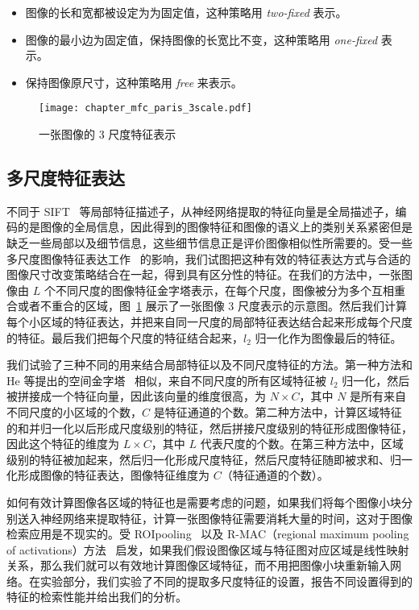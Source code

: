 \begin{itemize}
\item 图像的长和宽都被设定为为固定值，这种策略用 \emph{two-fixed} 表示。

\item 图像的最小边为固定值，保持图像的长宽比不变，这种策略用 \emph{one-fixed} 表示。

\item 保持图像原尺寸，这种策略用 \emph{free} 来表示。
\end{itemize}

\begin{figure}[!t]
	\centering
	\texttt{[image: chapter\_mfc\_paris\_3scale.pdf]}
	\caption{一张图像的 3 尺度特征表示}
	\label{fig:img_multiscale_feature}
\end{figure}

\subsection{多尺度特征表达}\label{subsec:multiscale_img_repr}
不同于 SIFT~\cite{Lowe2004DistinctiveIF} 等局部特征描述子，从神经网络提取的特征向量是全局描述子，编码的是图像的全局信息，因此得到的图像特征和图像的语义上的类别关系紧密但是缺乏一些局部以及细节信息，这些细节信息正是评价图像相似性所需要的。受一些多尺度图像特征表达工作~\cite{Lazebnik2006BeyondBO,He2014SpatialPP} 的影响，我们试图把这种有效的特征表达方式与合适的图像尺寸改变策略结合在一起，得到具有区分性的特征。在我们的方法中，一张图像由 $L$ 个不同尺度的图像特征金字塔表示，在每个尺度，图像被分为多个互相重合或者不重合的区域，图~\ref{fig:img_multiscale_feature} 展示了一张图像 3 尺度表示的示意图。然后我们计算每个小区域的特征表达，并把来自同一尺度的局部特征表达结合起来形成每个尺度的特征。最后我们把每个尺度的特征结合起来，$l_2$ 归一化作为图像最后的特征。

我们试验了三种不同的用来结合局部特征以及不同尺度特征的方法。第一种方法和 He 等提出的空间金字塔~\cite{He2014SpatialPP} 相似，来自不同尺度的所有区域特征被 $l_2$ 归一化，然后被拼接成一个特征向量，因此该向量的维度很高，为 $N\times C$，其中 $N$ 是所有来自不同尺度的小区域的个数，$C$ 是特征通道的个数。第二种方法中，计算区域特征的和并归一化以后形成尺度级别的特征，然后拼接尺度级别的特征形成图像特征，因此这个特征的维度为 $L \times C$，其中 $L$ 代表尺度的个数。在第三种方法中，区域级别的特征被加起来，然后归一化形成尺度特征，然后尺度特征随即被求和、归一化形成图像的特征表达，图像特征维度为 $C$（特征通道的个数）。

如何有效计算图像各区域的特征也是需要考虑的问题，如果我们将每个图像小块分别送入神经网络来提取特征，计算一张图像特征需要消耗大量的时间，这对于图像检索应用是不现实的。受 ROIpooling~\cite{Ren2017FasterRT} 以及 R-MAC（regional maximum pooling of activations）方法~\cite{Tolias2015ParticularOR} 启发，如果我们假设图像区域与特征图对应区域是线性映射关系，那么我们就可以有效地计算图像区域特征，而不用把图像小块重新输入网络。在实验部分，我们实验了不同的提取多尺度特征的设置，报告不同设置得到的特征的检索性能并给出我们的分析。

